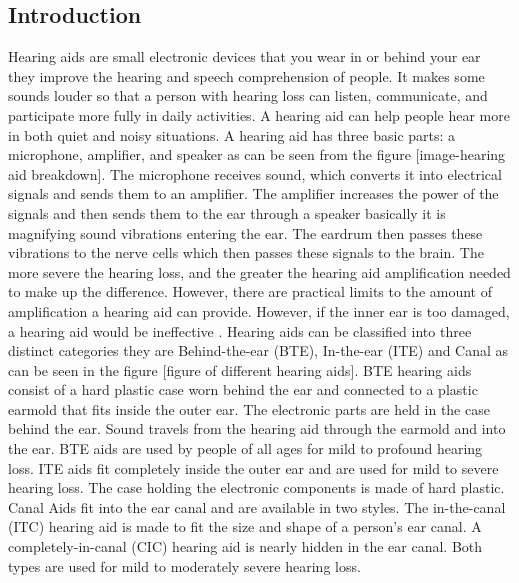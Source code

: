 \documentclass[sigconf]{acmart}
\begin{document}
\subsection{Introduction}


Hearing aids are small electronic devices that you wear in or behind your ear they improve the hearing and speech comprehension of people. It makes some sounds louder so that a person with hearing loss can listen, communicate, and participate more fully in daily activities. A hearing aid can help people hear more in both quiet and noisy situations. A hearing aid has three basic parts: a microphone, amplifier, and speaker as can be seen from the figure [image-hearing aid breakdown]. The microphone receives sound, which converts it into electrical signals and sends them to an amplifier. The amplifier increases the power of the signals and then sends them to the ear through a speaker basically it is magnifying sound vibrations entering the ear. The eardrum then passes these vibrations to the nerve cells which then passes these signals to the brain. The more severe the hearing loss, and the greater the hearing aid amplification needed to make up the difference. However, there are practical limits to the amount of amplification a hearing aid can provide. However, if the inner ear is too damaged, a hearing aid would be ineffective \cite{NIHCD2017}.
\newline
Hearing aids can be classified into three distinct categories \cite{NIHCD2017} they are Behind-the-ear (BTE), In-the-ear (ITE) and Canal as can be seen in the figure [figure of different hearing aids]. BTE hearing aids consist of a hard plastic case worn behind the ear and connected to a plastic earmold that fits inside the outer ear. The electronic parts are held in the case behind the ear. Sound travels from the hearing aid through the earmold and into the ear. BTE aids are used by people of all ages for mild to profound hearing loss. ITE aids fit completely inside the outer ear and are used for mild to severe hearing loss. The case holding the electronic components is made of hard plastic.  Canal Aids fit into the ear canal and are available in two styles. The in-the-canal (ITC) hearing aid is made to fit the size and shape of a person’s ear canal. A completely-in-canal (CIC) hearing aid is nearly hidden in the ear canal. Both types are used for mild to moderately severe hearing loss\cite{NIHCD2017}.
\newline
\end{document}
